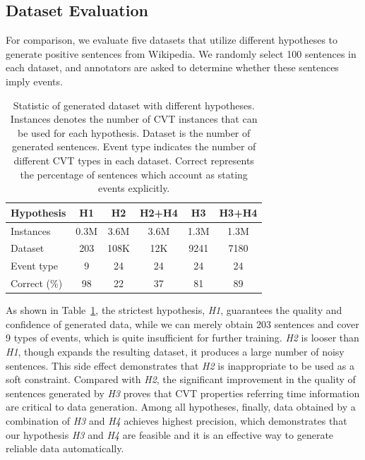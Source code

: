 \documentclass{article}
\begin{document}
\subsection{Dataset Evaluation}\label{sec:evalhypo}
For comparison, we evaluate five datasets that utilize different hypotheses to generate positive sentences from Wikipedia. We randomly select 100 sentences in each dataset, and annotators are asked to determine whether these sentences imply events. 

\begin{table}[h]
\small
\centering
\begin{tabular}{|l|c|c|c|c|c|} \hline
	Hypothesis & H1 & H2 & H2+H4 & H3 & H3+H4 \\ \hline
	Instances & 0.3M & 3.6M & 3.6M & 1.3M & 1.3M \\ \hline
	Dataset & 203 & 108K & 12K & 9241 & 7180 \\ \hline
	Event type & 9 & 24 & 24 & 24 & 24 \\ \hline
	Correct (\%) & 98 & 22 & 37 & 81 & 89 \\ \hline
\end{tabular}
\caption{Statistic of generated dataset with different hypotheses. Instances denotes the number of CVT instances that can be used for each hypothesis. Dataset is the number of generated sentences. Event type indicates the number of different CVT types in each dataset. Correct represents the percentage of sentences which account as stating events explicitly. \label{tab:3}}
\end{table}

As shown in Table~\ref{tab:3}, the strictest hypothesis, \emph{H1}, guarantees the quality and confidence of generated data, while we can merely obtain 203 sentences and cover 9 types of events,  which is quite insufficient for further training. \emph{H2} is looser than \emph{H1}, though expands the resulting dataset, it produces a large number of noisy sentences. This side effect demonstrates that \emph{H2} is inappropriate to be used as a soft constraint. Compared with \emph{H2}, the significant improvement in the quality of sentences generated by \emph{H3} proves that CVT properties referring time information are critical to data generation. Among all hypotheses, finally, data obtained by a combination of \emph{H3} and \emph{H4} achieves highest precision, which demonstrates that our hypothesis \emph{H3} and \emph{H4} are feasible and it is an effective way to generate reliable data automatically.
\end{document}

